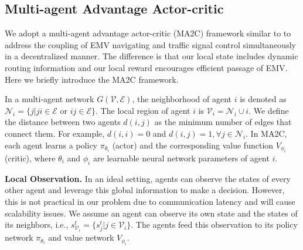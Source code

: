 


\subsection{Multi-agent Advantage Actor-critic}
\label{sec:MA2C}
We adopt a multi-agent advantage actor-critic (MA2C) framework similar to \cite{chu2019multi} to address the coupling of EMV navigating and traffic signal control simultaneously in a decentralized manner. The difference is that our local state includes dynamic routing information and our local reward encourages efficient passage of EMV. Here we briefly introduce the MA2C framework.

In a multi-agent network $G(\mathcal{V}, \mathcal{E})$, the neighborhood of agent $i$ is denoted as $\mathcal{N}_i = \{ j | ji\in \mathcal{E} \textrm{ or } ij\in \mathcal{E}\}$. The local region of agent $i$ is $\mathcal{V}_i = \mathcal{N}_i \cup i$. We define the distance between two agents $d(i, j)$ as the minimum number of edges that connect them. For example, $d(i, i) = 0$ and $d(i, j)=1, \forall j \in \mathcal{N}_i$. In MA2C, each agent learns a policy $\pi_{\theta_i}$ (actor) and the corresponding value function $V_{\phi_i}$ (critic), where ${\theta_i}$ and ${\phi_i}$ are learnable neural network parameters of agent $i$.


\textbf{Local Observation.} In an ideal setting, agents can observe the states of every other agent and leverage this global information to make a decision. However, this is not practical in our problem due to communication latency and will cause scalability issues. We assume an agent can observe its own state and the states of its neighbors, i.e., $s^t_{\mathcal{V}_i} = \{s^t_j|j\in \mathcal{V}_i\}$. The agents feed this observation to its policy network $\pi_{\theta_i}$ and value network $V_{\phi_i}$.


